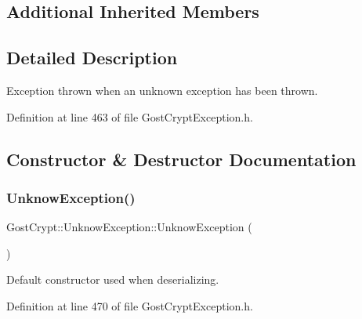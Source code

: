 \subsection*{Additional Inherited Members}


\subsection{Detailed Description}
Exception thrown when an unknown exception has been thrown. 

Definition at line 463 of file Gost\+Crypt\+Exception.\+h.



\subsection{Constructor \& Destructor Documentation}
\mbox{\label{class_gost_crypt_1_1_unknow_exception_aef9a371b92a79400a53facb2150a3b20}} 
\subsubsection{\texorpdfstring{Unknow\+Exception()}{UnknowException()}\hspace{0.1cm}{\footnotesize\ttfamily [1/2]}}
{\footnotesize\ttfamily Gost\+Crypt\+::\+Unknow\+Exception\+::\+Unknow\+Exception (\begin{DoxyParamCaption}{ }\end{DoxyParamCaption})\hspace{0.3cm}{\ttfamily [inline]}}



Default constructor used when deserializing. 



Definition at line 470 of file Gost\+Crypt\+Exception.\+h.

\mbox{\label{class_gost_crypt_1_1_unknow_exception_ae76a78c92ee428edd5f71aaff105b3ff}} 
